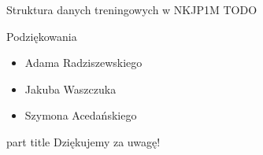 \documentclass{beamer}
\begin{document}
\begin{frame}{Struktura danych treningowych w NKJP1M}
  TODO
\end{frame}

\begin{frame}{Podziękowania}
  \begin{itemize}
    \item Adama Radziszewskiego
    \item Jakuba Waszczuka
    \item Szymona Acedańskiego
  \end{itemize}
\end{frame}

\begin{frame}{}
\begin{centering}
    \begin{beamercolorbox}[sep=12pt,center]{part title}
    Dziękujemy za uwagę!\par
    \end{beamercolorbox}
    \end{centering}
\end{frame}
\end{document}
